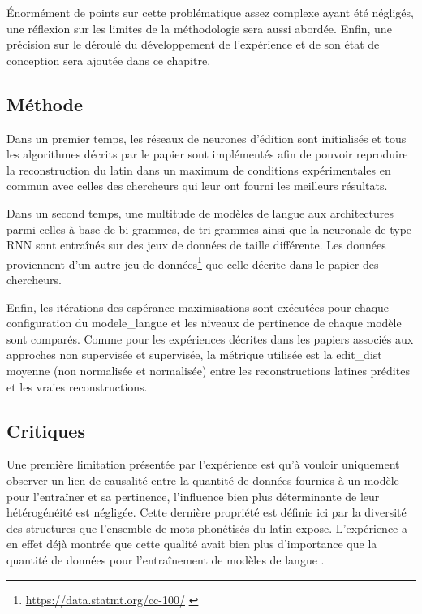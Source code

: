 \documentclass[12pt, twoside]{report}
\begin{document}
Énormément de points sur cette problématique assez complexe ayant été négligés, une réflexion sur les limites de la méthodologie sera aussi abordée. Enfin, une précision sur le déroulé du développement de l'expérience et de son état de conception sera ajoutée dans ce chapitre.

\subsection{Méthode}
Dans un premier temps, les réseaux de neurones d'édition sont initialisés et tous les algorithmes décrits par le papier sont implémentés afin de pouvoir reproduire la reconstruction du latin dans un maximum de conditions expérimentales en commun avec celles des chercheurs qui leur ont fourni les meilleurs résultats.

Dans un second temps, une multitude de modèles de langue aux architectures parmi celles à base de bi-grammes, de tri-grammes \autocite{huang, simons} ainsi que la neuronale de type RNN \autocite[chap.~9, p. 5-7]{jurafsky} sont entraînés sur des jeux de données de taille différente. Les données proviennent d'un autre jeu de données\footnote{\url{https://data.statmt.org/cc-100/} \autocite{conneau, wenzek}} que celle décrite dans le papier des chercheurs. 

Enfin, les itérations des espérance-maximisations sont exécutées pour chaque configuration du \gls{modele_langue} et les niveaux de pertinence de chaque modèle sont comparés. Comme pour les expériences décrites dans les papiers associés aux approches non supervisée et supervisée, la métrique utilisée est la \gls{edit_dist} moyenne (non normalisée et normalisée) entre les reconstructions latines prédites et les vraies reconstructions.

\subsection{Critiques}
Une première limitation présentée par l'expérience est qu'à vouloir uniquement observer un lien de causalité entre la quantité de données fournies à un modèle pour l'entraîner et sa pertinence, l'influence bien plus déterminante de leur hétérogénéité est négligée. Cette dernière propriété est définie ici par la diversité des structures que l'ensemble de mots phonétisés du latin expose. L'expérience a en effet déjà montrée que cette qualité avait bien plus d'importance que la quantité de données pour l'entraînement de modèles de langue \autocite{camembert}.
\end{document}
